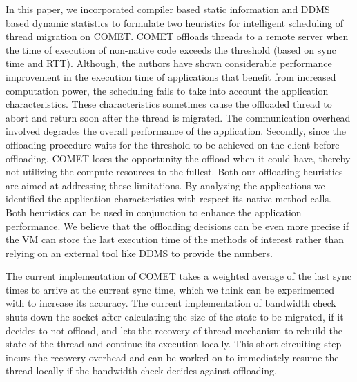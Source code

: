 In this paper, we incorporated compiler based static information and DDMS based dynamic statistics to formulate two heuristics for intelligent scheduling of thread migration on COMET. COMET offloads threads to a remote server when the time of execution of non-native code exceeds the threshold (based on sync time and RTT). Although, the authors have shown considerable performance improvement in the execution time of applications that benefit from increased computation power, the scheduling fails to take into account the application characteristics. These characteristics sometimes cause the offloaded thread to abort and return soon after the thread is migrated. The communication overhead involved degrades the overall performance of the application. Secondly, since the offloading procedure waits for the threshold to be achieved on the client before offloading, COMET loses the opportunity the offload when it could have, thereby not utilizing the compute resources to the fullest.
Both our offloading heuristics are aimed at addressing these limitations. By analyzing the applications we identified the application characteristics with respect its native method calls. Both heuristics can be used in conjunction to enhance the application performance.
We believe that the offloading decisions can be even more precise if the VM can store the last execution time of the methods of interest rather than relying on an external tool like DDMS to provide the numbers.
 
The current implementation of COMET takes a weighted average of the last sync times to arrive at the current sync time, which we think can be experimented with to increase its accuracy. The current implementation of bandwidth check shuts down the socket after calculating the size of the state to be migrated, if it decides to not offload, and lets the recovery of thread mechanism to rebuild the state of the thread and continue its execution locally. This short-circuiting step incurs the recovery overhead and can be worked on to immediately resume the thread locally if the bandwidth check decides against offloading.

